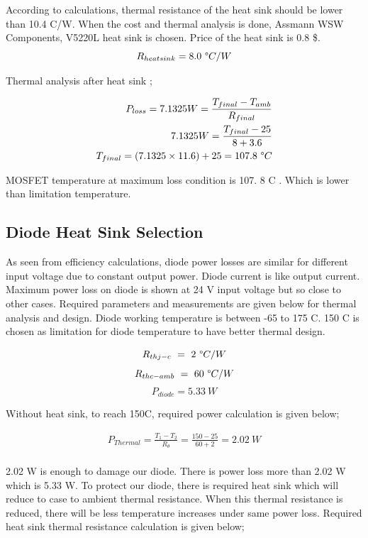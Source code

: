 According to calculations, thermal resistance of the heat sink should be lower than 10.4 \degree C/W. When the cost and thermal analysis is done, Assmann WSW Components, V5220L heat sink is chosen. Price of the heat sink is 0.8 \$. 
$$R_{heat sink} = 8.0\ \degree C/W $$

Thermal analysis after heat sink ;

\begin{align}
    P_{loss} = 7.1325 W = \frac{T_{final}-T_{amb}}{R_{final}}\\
    7.1325 W = \frac{T_{final}-25}{8+3.6} \\
    T_{final} = (7.1325 \times 11.6 ) + 25 = 107.8\ \degree C 
\end{align}

MOSFET temperature at maximum loss condition is 107. 8 \degree C . Which is lower than limitation temperature.

\subsection{Diode Heat Sink Selection}

As seen from efficiency calculations, diode power losses are similar for different input voltage due to constant output power. Diode current is like output current. Maximum power loss on diode is shown at 24 V input voltage but so close to other cases. Required parameters and measurements are given below for thermal analysis and design. Diode working temperatıre is between -65 to 175 \degree C. 150  \degree C is chosen as limitation for diode temperature to have better thermal design. 

$$R_{thj-c}\ =\ 2\ \degree C / W$$
$$R_{thc-amb}\ =\ 60\ \degree C / W$$
$$P_{diode}  = 5.33\ W$$

Without heat sink, to reach 150\degree C, required power calculation is given below;

\begin{align}
    P_{Thermal} = \frac{T_1 - T_2}{R_\theta} = \frac{150-25}{60+2} = 2.02\ W \\
\end{align}

2.02 W is enough to damage our diode. There is power loss more than 2.02 W which is 5.33 W. To protect our diode, there is required heat sink which will reduce to case to ambient thermal resistance. When this thermal resistance is reduced, there will be less temperature increases under same power loss. Required heat sink thermal resistance calculation is given below;

